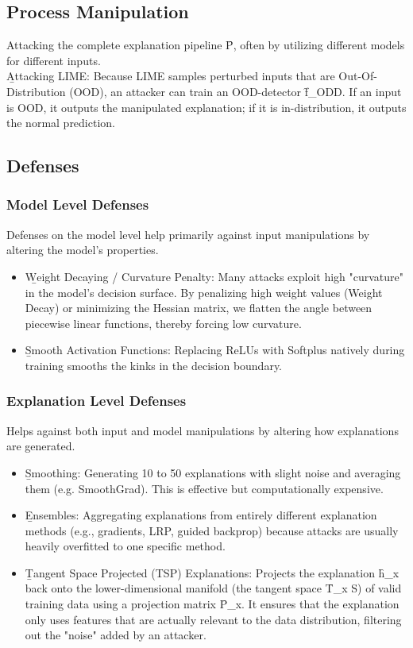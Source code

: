 \subsection{Process Manipulation}
Attacking the complete explanation pipeline \f{P}, often by utilizing different models for different inputs.\\[1em]
\b{Attacking LIME}: Because LIME samples perturbed inputs that are Out-Of-Distribution (OOD), an attacker can train an OOD-detector \f{f_{ODD}}. If an input is OOD, it outputs the manipulated explanation; if it is in-distribution, it outputs the normal prediction.



\subsection{Defenses}
\subsubsection{Model Level Defenses}
Defenses on the model level help primarily against input manipulations by altering the model's properties.
\begin{itemize}
\item \b{Weight Decaying / Curvature Penalty}: Many attacks exploit high "curvature" in the model's decision surface. By penalizing high weight values (Weight Decay) or minimizing the Hessian matrix, we flatten the angle between piecewise linear functions, thereby forcing low curvature.
\item \b{Smooth Activation Functions}: Replacing ReLUs with Softplus natively during training smooths the kinks in the decision boundary.
\end{itemize}


\subsubsection{Explanation Level Defenses}
Helps against both input and model manipulations by altering how explanations are generated.
\begin{itemize}
\item \b{Smoothing}: Generating 10 to 50 explanations with slight noise and averaging them (e.g. SmoothGrad). This is effective but computationally expensive.
\item \b{Ensembles}: Aggregating explanations from entirely different explanation methods (e.g., gradients, LRP, guided backprop) because attacks are usually heavily overfitted to one specific method.
\item \b{Tangent Space Projected (TSP) Explanations}: Projects the explanation \f{h_{x}} back onto the lower-dimensional manifold (the tangent space \f{T_x S}) of valid training data using a projection matrix \f{P_x}. It ensures that the explanation only uses features that are actually relevant to the data distribution, filtering out the "noise" added by an attacker.
\end{itemize}


